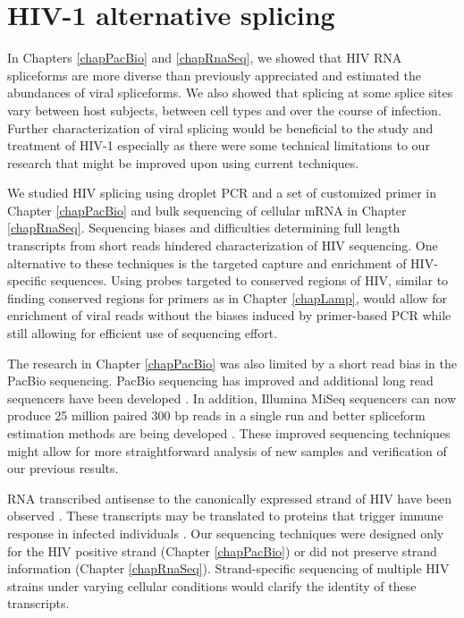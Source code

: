 \documentclass[../sherrill-Mix_thesis.tex]{subfiles}
\begin{document}
\section{HIV-1 alternative splicing}
	In Chapters \ref{chapPacBio} and \ref{chapRnaSeq}, we showed that HIV RNA spliceforms are more diverse than previously appreciated and estimated the abundances of viral spliceforms. We also showed that splicing at some splice sites vary between host subjects, between cell types and over the course of infection. Further characterization of viral splicing would be beneficial to the study and treatment of HIV-1 especially as there were some technical limitations to our research that might be improved upon using current techniques.
	
	We studied HIV splicing using droplet PCR \citep{Tewhey2009} and a set of customized primer in Chapter \ref{chapPacBio} and bulk sequencing of cellular mRNA in Chapter \ref{chapRnaSeq}. Sequencing biases and difficulties determining full length transcripts from short reads hindered characterization of HIV sequencing. One alternative to these techniques is the targeted capture and enrichment \citep{Depledge2011,Mercer2014} of HIV-specific sequences. Using probes targeted to conserved regions of HIV, similar to finding conserved regions for primers as in Chapter \ref{chapLamp}, would allow for enrichment of viral reads without the biases induced by primer-based PCR while still allowing for efficient use of sequencing effort.

	The research in Chapter \ref{chapPacBio} was also limited by a short read bias in the PacBio sequencing. PacBio sequencing has improved \citep{Mosher2014} and additional long read sequencers have been developed \citep{Mikheyev2014,Jain2015,Kilianski2015}. In addition, Illumina MiSeq sequencers can now produce 25 million paired 300 bp reads in a single run \citep{Juenemann2013,Illumina2015} and better spliceform estimation methods are being developed \citep{Rossell2014,Bray2015}. These improved sequencing techniques might allow for more straightforward analysis of new samples and verification of our previous results.

	RNA transcribed antisense to the canonically expressed strand of HIV have been observed \citep{Michael1994,Landry2007,Lefebvre2011,Schopman2012,Kobayashi-Ishihara2012,Saayman2014,Berger2015}. These transcripts may be translated to proteins \citep{Ludwig2006,Torresilla2013} that trigger immune response in infected individuals \citep{Ludwig2006,Bansal2010,Berger2015}.  Our sequencing techniques were designed only for the HIV positive strand (Chapter \ref{chapPacBio}) or did not preserve strand information (Chapter \ref{chapRnaSeq}). Strand-specific sequencing \citep{Levin2010,Podnar2014} of multiple HIV strains under varying cellular conditions would clarify the identity of these transcripts. 
	
\end{document}
